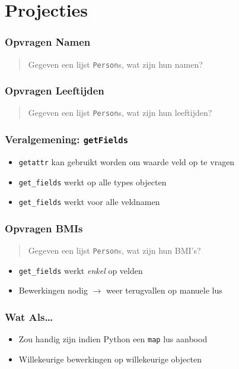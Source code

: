 \section{Projecties}

\frame{\tableofcontents[currentsection]}

\begin{frame}
  \frametitle{Opvragen Namen}
  \begin{quote}
    Gegeven een lijst \texttt{Person}s, wat zijn hun namen?
  \end{quote}
\end{frame}

\begin{frame}
  \frametitle{Opvragen Leeftijden}
  \begin{quote}
    Gegeven een lijst \texttt{Person}s, wat zijn hun leeftijden?
  \end{quote}
\end{frame}

\begin{frame}
  \frametitle{Veralgemening: \texttt{getFields}}
  \begin{itemize}
    \item \texttt{getattr} kan gebruikt worden om waarde veld op te vragen
    \item \texttt{get\_fields} werkt op alle types objecten
    \item \texttt{get\_fields} werkt voor alle veldnamen
  \end{itemize}
\end{frame}

\begin{frame}
  \frametitle{Opvragen BMIs}
  \begin{quote}
    Gegeven een lijst \texttt{Person}s, wat zijn hun BMI's?
  \end{quote}
  \begin{itemize}
    \item \texttt{get\_fields} werkt \emph{enkel} op velden
    \item Bewerkingen nodig $\rightarrow$ weer terugvallen op manuele lus
  \end{itemize}
\end{frame}

\begin{frame}
  \frametitle{Wat Als\dots}
  \begin{itemize}
    \item Zou handig zijn indien Python een {\tt map} lus aanbood
  \end{itemize}
  \begin{itemize}
    \item Willekeurige bewerkingen op willekeurige objecten
  \end{itemize}
\end{frame}

